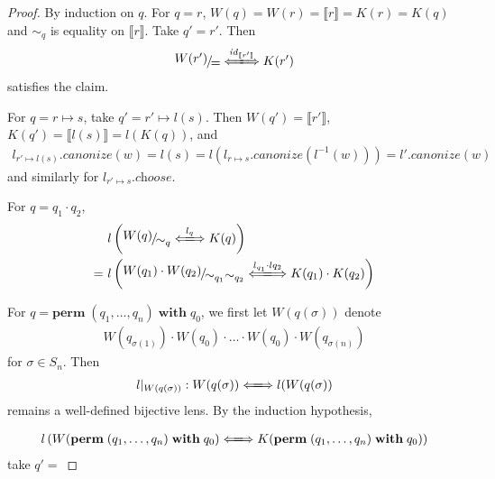 \documentclass[a4paper,11pt] {article}
\theoremstyle{plain}
\newcommand{\lcanonize}[1]{\textit{$#1$.canonize}}
\newcommand{\lchoose}[1]{\textit{$#1$.choose}}
\newcommand{\lensbetween}[1]{\xLongleftrightarrow{#1}}
\newcommand{\perm}{ \textbf{perm}\; }
\newcommand{\with}{ \;\textbf{with}\; }
\newcommand{\niceFrac}[2]{%
    \raise.5ex\hbox{$#1$}%
    \kern-.1em/\kern-.15em%
    \lower.25ex\hbox{$#2$}}
\begin{document}
\begin{proof}
  By induction on $q$.
  For $q = r$, $W(q) = W(r) = \llbracket r \rrbracket = K(r) = K(q)$ and
  $\sim_q$ is equality on $\llbracket r \rrbracket$.
  Take $q' = r'$. Then
  \begin{align*}
    \niceFrac{W(r')}{=}
    \lensbetween{\mathit{id}_{\llbracket r' \rrbracket}} K(r')
  \end{align*}
  satisfies the claim.

  For $q = r \mapsto s$, take $q' = r' \mapsto l(s)$. Then
  $W(q') = \llbracket r' \rrbracket$,
  $K(q') = \llbracket l(s) \rrbracket = l(K(q))$,
  and
  \begin{align*}
    \lcanonize{l_{r' \mapsto l(s)}}(w)
    = l(s)
    = l(\lcanonize{l_{r \mapsto s}}(l^{-1}(w)))
    = \lcanonize{l'}(w)
  \end{align*}
  and similarly for $\lchoose{l_{r' \mapsto s}}$.

  For $q = q_1 \cdot q_2$,
  \begin{align*}
    &l \left(\niceFrac{W(q)}{\sim_q} \lensbetween{l_q} K(q) \right) \\
    =~& l\left(\niceFrac{W(q_1) \cdot W(q_2)}{\sim_{q_1}\sim_{q_2}}
    \lensbetween{l_{q_1} \cdot l{q_2}}
    K(q_1) \cdot K(q_2) \right)
  \end{align*}
  
  
  For $q = \perm(q_1, \ldots, q_n) \with q_0$,
  we first let $W(q(\sigma))$ denote
  \begin{align*}
    W(q_{\sigma(1)}) \cdot W(q_0) \cdot \ldots \cdot W(q_0) \cdot
    W(q_{\sigma(n)})
  \end{align*}
  for $\sigma \in S_n$.
  Then 
  \begin{align*}
    l |_{W(q(\mathit{\sigma}))} :
    W(q(\mathit{\sigma})) \lensbetween{}
    l(W(q(\mathit{\sigma}))
  \end{align*}
  remains a well-defined bijective lens.
  By the induction hypothesis, 
  
  \begin{align*}
    l \left( W(\perm(q_1, \ldots, q_n) \with q_0) \lensbetween{}
    K(\perm(q_1, \ldots, q_n) \with q_0) \right)
  \end{align*}
  take $q' = $
    
    
\end{proof}
\end{document}

